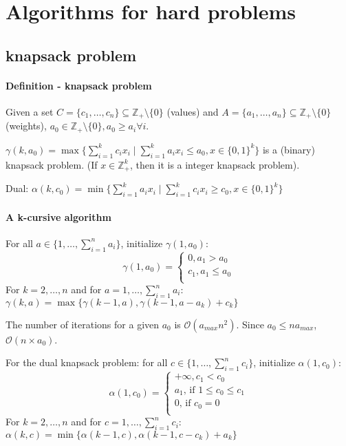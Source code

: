 \documentclass[main]{subfiles}
\begin{document}

\section{Algorithms for hard problems}

\subsection{knapsack problem}
\paragraph{Definition - knapsack problem}

Given a set $C = \{ c_{1}, \dots, c_{n} \} \subseteq \mathbb{Z}_{+} \setminus
\{ 0\}$ (values) and $A = \{a_{1}, \dots, a_{n}\} \subseteq \mathbb{Z}_{+}
\setminus \{ 0\}$ (weights), $a_{0} \in \mathbb{Z}_{+} \setminus \{ 0\},
a_{0} \geq a_{i} \forall i$.

$\gamma(k, a_{0}) = \max \{\sum_{i =1}^{k} c_{i} x_{i} \mid \sum_{i=1}^{k}
a_{i}x_{i} \leq a_{0}, x \in \{0,1\}^{k} \}$ is a (binary) knapsack problem.
(If $x \in \mathbb{Z}_{+}^{k}$, then it is a integer knapsack problem).

Dual:
$\alpha(k, c_{0}) = \min \{ \sum_{i =1}^{k} a_{i} x_{i} \mid \sum_{i=1}^{k}
c_{i}x_{i} \geq c_{0}, x \in \{0,1\}^{k} \}$

\paragraph{A k-cursive algorithm}
For all $a \in \{1, \dots, \sum_{i=1}^{n} a_i\}$, initialize $\gamma(1, a_0)$:
\[
  \gamma(1, a_{0})=\begin{cases}
               0, a_{1} > a_{0}\\
               c_{1}, a_{1} \leq a_{0}\\
            \end{cases}
\]
For $k = 2, \dots, n$ and for $a = 1, \dots, \sum_{i=1}^{n} a_i$:
$\gamma(k, a) = \max \{\gamma(k-1, a), \gamma(k-1, a - a_k) + c_k \}$

The number of iterations for a given $a_{0}$ is $\mathcal{O}(a_{max} n^2)$.
Since $a_0 \leq n a_{max}$, $\mathcal{O}(n \times a_{0})$.

For the dual knapsack problem: for all $c \in \{1, \dots, \sum_{i=1}^{n} c_i
\}$, initialize $\alpha(1, c_0)$:
\[
  \alpha(1, c_{0})=\begin{cases}
               +\infty, c_{1} < c_{0}\\
               a_{1} \text{, if } 1 \leq c_0 \leq c_1\\
               0 \text{, if } c_0 = 0\\
            \end{cases}
\]
For $k = 2, \dots, n$ and for $c = 1, \dots, \sum_{i=1}^{n} c_i$:
$\alpha(k, c) = \min \{\alpha(k-1, c), \alpha(k-1, c - c_{k}) + a_{k}\}$
\end{document}
